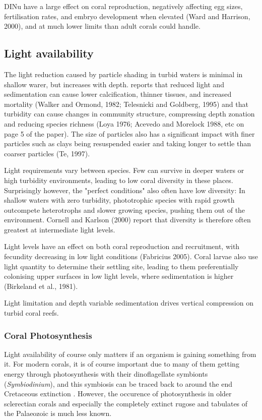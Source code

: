 \documentclass[11pt,a4paper]{article}
\begin{document}
DINu have a large effect on coral reproduction, negatively affecting egg sizes, fertilisation rates, and embryo development when elevated (Ward and Harrison, 2000), and at much lower limits than adult corals could handle.


\subsection{Light availability}

The light reduction caused by particle shading in turbid waters is minimal in shallow warer, but increases with depth.
 \cite{Fabricius2005} reports that reduced light and sedimentation can cause lower calcification, thinner tissues, and increased mortality (Walker and Ormond, 1982; Telesnicki and Goldberg, 1995) and that turbidity can cause changes in community structure, compressing depth zonation and reducing species richness (Loya 1976; Acevedo and Morelock 1988, etc on page 5 of the paper).
  The size of particles also has a significant impact with finer particles such as clays being resuspended easier and taking longer to settle than coarser particles (Te, 1997). 

Light requirements vary between species.
 Few can survive in deeper waters or high turbidity environments, leading to low coral diversity in these places.   
 Surprisingly however, the "perfect conditions" also often have low diversity: In shallow waters with zero turbidity, phototrophic species with rapid growth outcompete heterotrophs and slower growing species, pushing them out of the environment.
 Cornell and Karlson (2000) report that diversity is therefore often greatest at intermediate light levels. 

Light levels have an effect on both coral reproduction and recruitment, with fecundity decreasing in low light conditions (Fabricius 2005).
 Coral larvae also use light quantity to determine their settling site, leading to them preferentially colonising upper surfaces in low light levels, where sedimentation is higher (Birkeland et al., 1981). 

\cite{Morgan2020} Light limitation and depth variable sedimentation drives vertical compression on turbid coral reefs.

\subsubsection{Coral Photosynthesis}

Light availability of course only matters if an organism is gaining something from it.
 For modern corals, it is of course important due to many of them getting energy through photosynthesis with their dinoflagellate symbionts (\textit{Symbiodinium}), and this symbiosis can be traced back to around the end Cretaceous extinction \citep{Lipps2016photosynthesis}.
  However, the occurence of photosynthesis in older sclerectian corals and especially the completely extinct rugose and tabulates of the Palaeozoic is much less known. 
\end{document}

